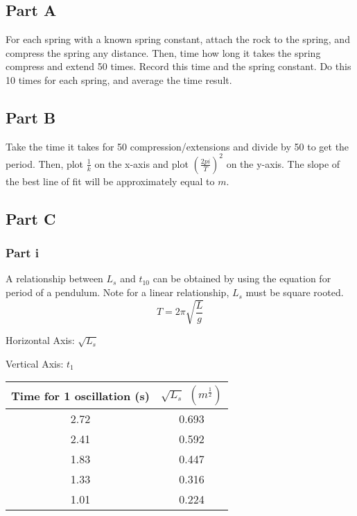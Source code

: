 \documentclass{article}
\begin{document}
\subsection {Part A}

For each spring with a known spring constant, attach the rock to the spring, and compress the spring any distance. Then, time how long it takes the spring compress and extend 50 times. Record this time and the spring constant. Do this 10 times for each spring, and average the time result.

\subsection {Part B}

Take the time it takes for 50 compression/extensions and divide by 50 to get the period. Then, plot $\frac{1}{k}$ on the x-axis and plot $(\frac{2pi}{T})^2$ on the y-axis. The slope of the best line of fit will be approximately equal to $m$.

\subsection {Part C}

\subsubsection {Part i}

A relationship between $L_s$ and $t_{10}$ can be obtained by using the equation for period of a pendulum. Note for a linear relationship, $L_s$ must be square rooted.
$$
T = 2\pi\sqrt{\frac{L}{g}}
$$

Horizontal Axis: $\sqrt{L_s}$

Vertical Axis: $t_1$

\begin{center}
  \begin{tabular}{|c|c|}
    \hline
    Time for 1 oscillation (s) & $\sqrt{L_s}$ $(m^\frac{1}{2})$\\
    \hline
    2.72 & 0.693 \\
    \hline
    2.41 & 0.592 \\
    \hline
    1.83 & 0.447 \\
    \hline
    1.33 & 0.316 \\
    \hline
    1.01 & 0.224 \\
    \hline
  \end{tabular}
\end{center}
\end{document}
